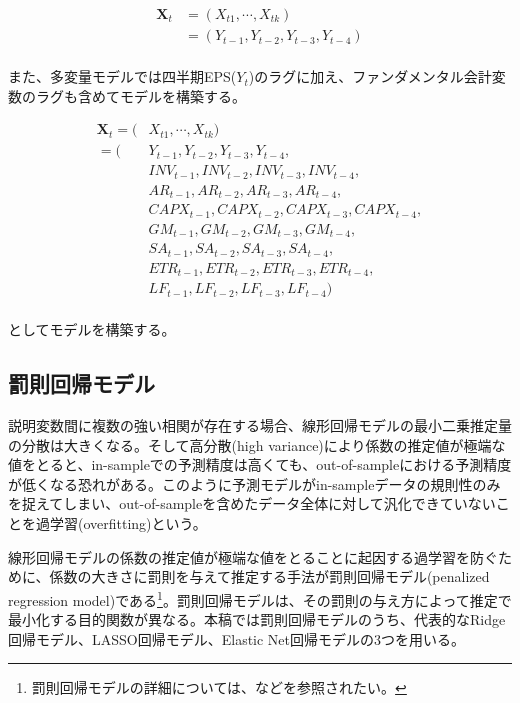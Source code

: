 \documentclass[a4paper, 12pt]{jsarticle}
\begin{document}
\begin{equation}
  \begin{split}
    \bm{X}_t &= (X_{t1}, \cdots ,X_{tk}) \\
    &= (Y_{t-1}, Y_{t-2}, Y_{t-3}, Y_{t-4}) \\
  \end{split}
\end{equation}

また、多変量モデルでは四半期EPS($Y_t$)のラグに加え、ファンダメンタル会計変数のラグも含めてモデルを構築する。

\begin{equation}
  \begin{split}
    \bm{X}_t = (&X_{t1}, \cdots ,X_{tk}) \\ 
    =(&Y_{t-1}, Y_{t-2}, Y_{t-3}, Y_{t-4}, \\
    & INV_{t-1}, INV_{t-2}, INV_{t-3}, INV_{t-4}, \\
    & AR_{t-1}, AR_{t-2}, AR_{t-3}, AR_{t-4}, \\
    & CAPX_{t-1}, CAPX_{t-2}, CAPX_{t-3}, CAPX_{t-4}, \\
    & GM_{t-1}, GM_{t-2}, GM_{t-3}, GM_{t-4}, \\
    & SA_{t-1}, SA_{t-2}, SA_{t-3}, SA_{t-4}, \\
    & ETR_{t-1}, ETR_{t-2}, ETR_{t-3}, ETR_{t-4}, \\ 
    & LF_{t-1}, LF_{t-2}, LF_{t-3}, LF_{t-4}) \\
  \end{split}
\end{equation}

としてモデルを構築する。

\subsection{罰則回帰モデル}

説明変数間に複数の強い相関が存在する場合、線形回帰モデルの最小二乗推定量の分散は大きくなる。そして高分散(high variance)により係数の推定値が極端な値をとると、in-sampleでの予測精度は高くても、out-of-sampleにおける予測精度が低くなる恐れがある。このように予測モデルがin-sampleデータの規則性のみを捉えてしまい、out-of-sampleを含めたデータ全体に対して汎化できていないことを過学習(overfitting)という。

線形回帰モデルの係数の推定値が極端な値をとることに起因する過学習を防ぐために、係数の大きさに罰則を与えて推定する手法が罰則回帰モデル(penalized regression model)である\footnote{罰則回帰モデルの詳細については、\cite*{hoerl1970ridge, tibshirani1996regression, zou2005regularization}などを参照されたい。}。罰則回帰モデルは、その罰則の与え方によって推定で最小化する目的関数が異なる。本稿では罰則回帰モデルのうち、代表的なRidge回帰モデル、LASSO回帰モデル、Elastic Net回帰モデルの3つを用いる。
\end{document}

